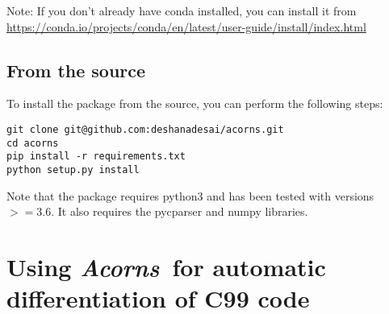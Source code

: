 \documentclass[a4,oneside]{book}
\def\Acorns{\emph{Acorns}}
\begin{document}
Note: If you don't already have conda installed, you can install it from \url{https://conda.io/projects/conda/en/latest/user-guide/install/index.html}

\subsection{From the source}
To install the package from the source, you can perform the following steps: \newline
\begin{lstlisting}
git clone git@github.com:deshanadesai/acorns.git 
cd acorns
pip install -r requirements.txt
python setup.py install
\end{lstlisting}


Note that the package requires python3 and has been tested with versions $>=3.6$.
It also requires the pycparser and numpy libraries. 

\section{Using \Acorns\ for automatic differentiation of C99 code}
\label{sec:ad}
\end{document}
